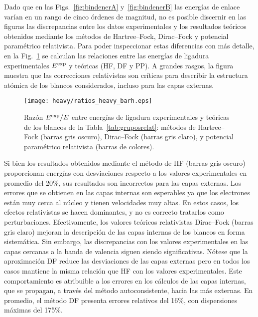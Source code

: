 Dado que en las Figs.~\ref{fig:bindenerA} y~\ref{fig:bindenerB} las 
energías de enlace varían en un rango de cinco órdenes de magnitud, no 
es posible discernir en las figuras las discrepancias entre los datos 
experimentales y los resultados teóricos obtenidos mediante los métodos 
de Hartree--Fock, Dirac--Fock y potencial paramétrico relativista. 
Para poder inspeccionar estas diferencias con más detalle, en la 
Fig.~\ref{fig:ratios} se calculan las relaciones entre las energías de 
ligadura experimentales $E^{\mbox{\scriptsize exp}}$ y teóricas (HF, DF 
y PP). A grandes rasgos, la figura muestra que las correcciones 
relativistas son críticas para describir la estructura atómica de los 
blancos considerados, incluso para las capas externas. 

\begin{figure}
\centering
\texttt{[image: heavy/ratios\_heavy\_barh.eps]} 
\caption[Razón $E^{\mbox{\scriptsize exp}}/E$ entre energías de ligadura 
experimentales y teóricas.]
{Razón $E^{\mbox{\scriptsize exp}}/E$ entre energías de ligadura 
experimentales y teóricas de los blancos de la 
Tabla~\ref{tab:gruposrelat}: métodos de Hartree--Fock (barras gris 
oscuro), Dirac--Fock (barras gris claro), y potencial paramétrico 
relativista (barras de colores).}
\label{fig:ratios}
\end{figure}

Si bien los resultados obtenidos mediante el método de HF (barras gris 
oscuro) proporcionan energías con desviaciones respecto a los valores 
experimentales en promedio del 20\%, sus resultados son incorrectos para 
las capas externas. Los errores que se obtienen en las 
capas internas son esperables ya que los electrones están muy cerca al 
núcleo y tienen velocidades muy altas. En estos casos, los efectos 
relativistas se hacen dominantes, y no es correcto tratarlos como 
perturbaciones. 
Efectivamente, los valores teóricos relativistas Dirac--Fock (barras 
gris claro) mejoran la descripción de las capas internas de los blancos 
en forma sistemática. Sin embargo, las discrepancias con los valores 
experimentales en las capas cercanas a la banda de valencia siguen 
siendo significativas. Nótese que la aproximación DF reduce las 
desviaciones de las capas externas pero en todos los casos mantiene 
la misma relación que HF con los valores experimentales. Este 
comportamiento es atribuible a los errores en los cálculos de las capas 
internas, que se propagan, a través del método autoconsistente, 
hacia las más externas. En promedio, el método DF presenta errores 
relativos del 16\%, con dispersiones máximas del 175\%. 

